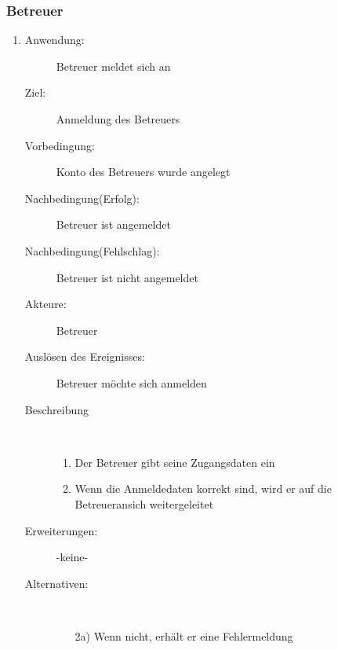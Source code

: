 \documentclass[parskip=full]{scrartcl}
\newcommand{\swtLabel}[1]{\textbf{/#1\arabic*0/}}
\begin{document}
\subsubsection{Betreuer}
\begin{enumerate} [label=\swtLabel{B}]
  \item
	 \begin{description}
		\item[Anwendung:] Betreuer meldet sich an
  		\item[Ziel:] Anmeldung des Betreuers
  		\item[Vorbedingung:] Konto des Betreuers wurde angelegt
  		\item[Nachbedingung(Erfolg):] Betreuer ist angemeldet
  		\item[Nachbedingung(Fehlschlag):] Betreuer ist nicht angemeldet
  		\item[Akteure:] Betreuer
  		\item[Auslösen des Ereignisses:] Betreuer möchte sich anmelden
  		\item[Beschreibung]~
  		\begin{enumerate}
  			\item Der Betreuer gibt seine Zugangsdaten ein
  			\item Wenn die Anmeldedaten korrekt sind, wird er auf die Betreueransich
  			weitergeleitet
  		\end{enumerate}
  		\item[Erweiterungen:] -keine-
  		\item[Alternativen:] ~
  		\begin{enumerate}
  		  \item[2a)] Wenn nicht, erhält er eine Fehlermeldung
  		\end{enumerate}  
  	\end{description}
   

\end{enumerate}
\end{document}
